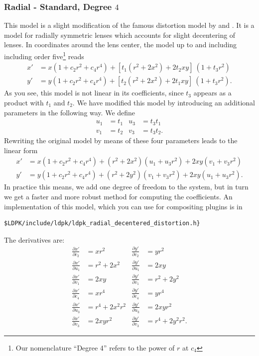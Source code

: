 \documentclass[10pt,a4paper]{article}
\begin{document}
\subsubsection{Radial - Standard, Degree $4$}
This model is a slight modification of the famous
distortion model by \Brown [1966] and \Conradi [1919].
It is a model for radially symmetric lenses which accounts for
slight decentering of lenses. In coordinates around the lens center,
the model up to and including including order five\footnote{Our nomenclature ``Degree 4'' refers to the power of $r$ at $c_4$} reads
\begin{align}
x' &= x (1 + c_2 r^2 + c_4 r^4) + \left[t_1(r^2+2x^2) + 2t_2 xy\right]\ (1 + t_3 r^2)\nonumber\\
y' &= y (1 + c_2 r^2 + c_4 r^4) + \left[t_2(r^2+2x^2) + 2t_1 xy\right]\ (1 + t_3 r^2) .
\end{align}
As you see, this model is not linear in its coefficients, since $t_3$ appears as a product with $t_1$ and $t_2$.
We have modified this model by introducing an additional parameters in the following way. We define
\begin{align}
u_1 &= t_1 & u_3 &= t_3 t_1 \nonumber\\
v_1 &= t_2 & v_3 &= t_3 t_2.
\end{align}
Rewriting the original model by means of these four parameters leads to the linear form
\begin{align}
x'	&= x (1 + c_2 r^2 + c_4 r^4)
	+ (r^2 + 2 x^2)	(u_1 + u_3 r^2)
	+ 2 xy		(v_1 + v_3 r^2) \nonumber\\
y'	&= y (1 + c_2 r^2 + c_4 r^4)
	+ (r^2 + 2 y^2)	(v_1 + v_3 r^2)
	+ 2 xy		(u_1 + u_3 r^2).
\end{align}
In practice this means, we add one degree of freedom to the system,
but in turn we get a faster and more robust method for computing the coefficients.
An implementation of this model, which you can use for compositing plugins is
in
\begin{verbatim}
$LDPK/include/ldpk/ldpk_radial_decentered_distortion.h}
\end{verbatim}
The derivatives are:
\begin{align}
\frac {\partial x'} {\partial c_2} &= x r^2 &
\frac {\partial y'} {\partial c_2} &= y r^2 \nonumber\\
\frac {\partial x'} {\partial u_1} &= r^2 + 2x^2 &
\frac {\partial y'} {\partial u_1} &= 2xy \nonumber\\
\frac {\partial x'} {\partial v_1} &= 2xy &
\frac {\partial y'} {\partial v_1} &= r^2+2y^2 \nonumber\\
\frac {\partial x'} {\partial c_4} &= x r^4 &
\frac {\partial y'} {\partial c_4} &= y r^4 \nonumber\\
\frac {\partial x'} {\partial u_3} &= r^4+2x^2r^2 &
\frac {\partial y'} {\partial u_3} &= 2xyr^2 \nonumber\\
\frac {\partial x'} {\partial v_3} &= 2xyr^2 &
\frac {\partial y'} {\partial v_3} &= r^4+2y^2r^2.
\end{align}
\end{document}
